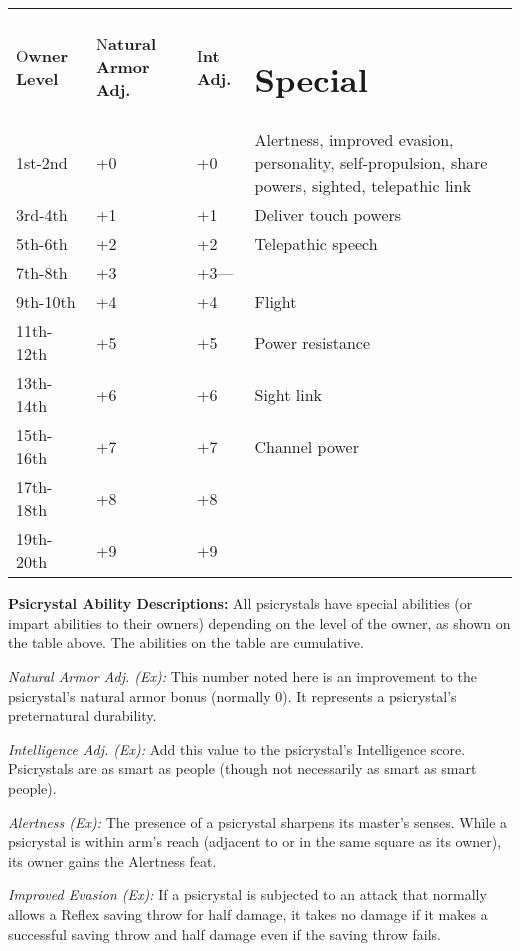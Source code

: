 \documentclass{article}
\begin{document}
\vspace{12pt}
\begin{tabular}{|>{\raggedright}p{38pt}|>{\raggedright}p{47pt}|>{\raggedright}p{31pt}|>{\raggedright}p{185pt}|}
\hline
\multicolumn{4}{|p{302pt}|}{P\textbf{sicrystal Special Abilities}}\tabularnewline
\hline
O\textbf{wner Level} & N\textbf{atural Armor Adj.} & I\textbf{nt Adj.} & \section*{S\textbf{pecial}}\tabularnewline
\hline
1st-2nd & +0 & +0 & Alertness, improved evasion, personality, self-propulsion, 
share powers, sighted, telepathic link\tabularnewline
\hline
3rd-4th & +1 & +1 & Deliver touch powers\tabularnewline
\hline
5th-6th & +2 & +2 & Telepathic speech\tabularnewline
\hline
7th-8th & +3 & +3--- & \tabularnewline
\hline
9th-10th & +4 & +4 & Flight\tabularnewline
\hline
11th-12th & +5 & +5 & Power resistance\tabularnewline
\hline
13th-14th & +6 & +6 & Sight link\tabularnewline
\hline
15th-16th & +7 & +7 & Channel power\tabularnewline
\hline
17th-18th & +8 & +8 & \tabularnewline
\hline
19th-20th & +9 & +9 & \tabularnewline
\hline
\end{tabular}

\vspace{12pt}
\textbf{Psicrystal Ability Descriptions:} All psicrystals have special abilities 
(or impart abilities to their owners) depending on the level of the owner, as shown 
on the table above. The abilities on the table are cumulative.

\textit{Natural Armor Adj. (Ex): }This number noted here is an improvement to the 
psicrystal's natural armor bonus (normally 0). It represents a psicrystal's preternatural 
durability.

\textit{Intelligence Adj. (Ex): }Add this value to the psicrystal's Intelligence 
score. Psicrystals are as smart as people (though not necessarily as smart as smart 
people).

\textit{Alertness (Ex): }The presence of a psicrystal sharpens its master's senses. 
While a psicrystal is within arm's reach (adjacent to or in the same square as 
its owner), its owner gains the Alertness feat.

\textit{Improved Evasion (Ex): }If a psicrystal is subjected to an attack that 
normally allows a Reflex saving throw for half damage, it takes no damage if it 
makes a successful saving throw and half damage even if the saving throw fails.
\end{document}
